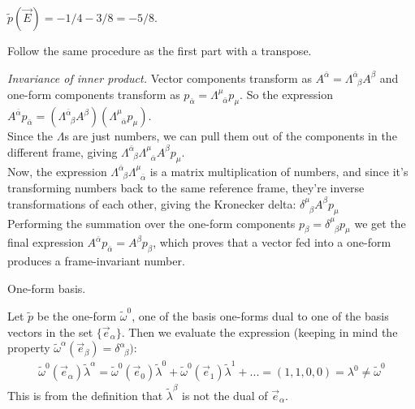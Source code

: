 \documentclass{report}
\begin{document}
\begin{subquests}
\begin{subquests}
		\item 
		$\tilde p (\vec E) = -1/4 - 3/8 = -5/8$.

		\item
		Follow the same procedure as the first part with a transpose.
	\end{subquests}

	\item \emph{Invariance of inner product.}
	Vector components transform as $A^{\bar \alpha} = \Lambda^{\bar \alpha}_{\;\;\beta} A^{\beta}$ and one-form components transform as $p_{\bar \alpha} = \Lambda_{\;\;\bar \alpha}^{\mu} p_{\mu}$. So the expression $A^{\bar \alpha} p_{\bar \alpha} = (\Lambda^{\bar \alpha}_{\;\;\beta} A^{\beta}) \left(\Lambda_{\;\;\bar \alpha}^{\mu} p_{\mu}\right)$. \\
	Since the $\Lambda$s are just numbers, we can pull them out of the components in the different frame, giving $\Lambda^{\bar \alpha}_{\;\;\beta} \Lambda_{\;\;\bar \alpha}^{\mu} A^{\beta} p_{\mu}$. \\ 
	Now, the expression $\Lambda^{\bar \alpha}_{\;\;\beta} \Lambda_{\;\;\bar \alpha}^{\mu}$ is a matrix multiplication of numbers, and since it's transforming numbers back to the same reference frame, they're inverse transformations of each other, giving the Kronecker delta: $\delta^{\mu}_{\;\;\beta}A^{\beta} p_{\mu}$ \\
	Performing the summation over the one-form components $p_{\beta} = \delta^{\mu}_{\;\;\beta} p_{\mu}$ we get the final expression $A^{\bar \alpha} p_{\bar \alpha} = A^{\beta} p_{\beta}$, which proves that a vector fed into a one-form produces a frame-invariant number.

	\item{One-form basis.}
	\begin{subquests}
		\item Let $\tilde p$ be the one-form $\tilde \omega^0$, one of the basis one-forms dual to one of the basis vectors in the set $\{\vec e_{\alpha}\}$. Then we evaluate the expression (keeping in mind the property $\tilde \omega^{\alpha}(\vec e_{\beta}) = \delta^{\alpha}_{\;\;\beta})$:
		\begin{gather*}
			\tilde \omega^0 (\vec e_{\alpha}) \tilde \lambda^{\alpha} = \tilde \omega^0 (\vec e_0) \tilde \lambda^0 + \tilde \omega^0 (\vec e_1) \tilde \lambda^1 + ... = (1, 1, 0, 0) = \lambda^0 \neq \tilde \omega^0  
		\end{gather*}
		This is from the definition that $\tilde \lambda^{\beta}$ is not the dual of $\vec e_{\alpha}$.
		

\end{subquests}
\end{subquests}
\end{document}
